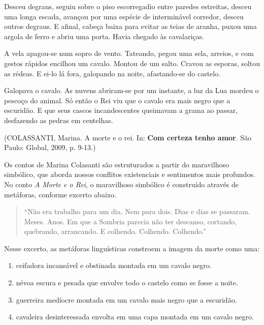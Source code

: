 Desceu degraus, seguiu sobre o piso escorregadio entre paredes estreitas, desceu uma longa escada, avançou por uma espécie de interminável corredor, desceu outros degraus. E afinal, cabeça baixa para evitar as teias de aranha, puxou uma argola de ferro e abriu uma porta. Havia chegado às cavalariças.

A vela apagou-se num sopro de vento. Tateando, pegou uma sela, arreios, e com gestos rápidos encilhou um cavalo. Montou de um salto. Cravou as esporas, soltou as rédeas. E ei-lo lá fora, galopando na noite, afastando-se do castelo.

Galopava o cavalo. As nuvens abriram-se por um instante, a luz da Lua mordeu o pescoço do animal. Só então o Rei viu que o cavalo era mais negro que a escuridão. E que seus cascos incandescentes queimavam a grama ao passar, desfazendo as pedras em centelhas.

\begin{flushright}(COLASSANTI, Marina. A morte e o rei. In: \textbf{Com certeza tenho amor}. São Paulo: Global, 2009, p. 9-13.)\end{flushright}

Os contos de Marina Colasanti são estruturados a partir do maravilhoso simbólico, que aborda nossos conflitos existenciais e sentimentos mais profundos. No conto \textit{A Morte e o Rei}, o maravilhoso simbólico é construído através de metáforas, conforme excerto abaixo.

\begin{quote}“Não era trabalho para um dia. Nem para dois. Dias e dias se passaram. Meses. Anos. Em que a Sombria parecia não ter descanso, cortando, quebrando, arrancando. E colhendo. Colhendo. Colhendo.”\end{quote}

Nesse excerto, as metáforas linguísticas constroem a imagem da morte como uma:
\begin{enumerate}
\item ceifadora incansável e obstinada montada em um cavalo negro.
\item névoa escura e pesada que envolve todo o castelo como se fosse a noite.
\item guerreira medíocre montada em um cavalo mais negro que a escuridão.
\item cavaleira desinteressada envolta em uma capa montada em um cavalo negro.
\end{enumerate}
